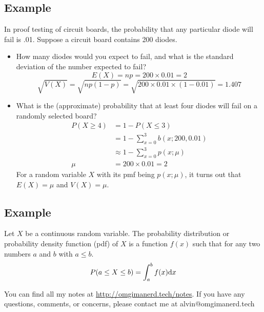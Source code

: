 \documentclass[letterpaper, 12pt]{math}
\begin{document}
\subsection*{Example}
In proof testing of circuit boards, the probability that any particular diode
will fail is .01. Suppose a circuit board contains 200 diodes.
\begin{itemize}
  \item How many diodes would you expect to fail, and what is the standard
    deviation of the number expected to fail?
    \[ E(X) = np = 200\times0.01 = 2 \]
    \[ \sqrt{V(X)} = \sqrt{np(1-p)} = \sqrt{200\times0.01\times(1-0.01)} =
       1.407 \]
  \item What is the (approximate) probability that at least four diodes will
    fail on a randomly selected board?
    \begin{align*}
      P(X\geq 4) &= 1-P(X\leq 3) \\
      &= 1-\sum_{x=0}^{3}b(x;200,0.01) \\
      &\approx 1-\sum_{x=0}^{3}p(x;\mu) \\
      \mu &= 200\times0.01 = 2
    \end{align*}
    For a random variable \( X \) with its pmf being \( p(x;\mu) \), it turns
    out that \( E(X) = \mu \) and \( V(X) = \mu \).
\end{itemize}

\subsection*{Example}
Let \( X \) be a continuous random variable. The probability distribution or
probability density function (pdf) of \( X \) is a function \( f(x) \) such that
for any two numbers \( a \) and \( b \) with \( a \leq b \).
\[ P(a\leq X\leq b) = \int_{a}^{b}f(x)\mathrm{d}{x} \]

\begin{center}
  You can find all my notes at \url{http://omgimanerd.tech/notes}. If you have
  any questions, comments, or concerns, please contact me at
  alvin@omgimanerd.tech
\end{center}
\end{document}
